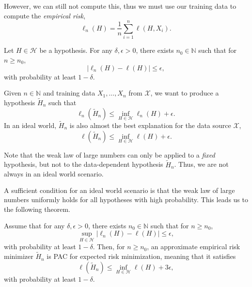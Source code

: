 However, we can still not compute this, thus we must use our training data to compute the
\textit{empirical risk}, \[
    \ell_n(H) = \frac{1}{n} \sum_{i=1}^{n} \ell(H,X_i).
\]

\begin{lemma}
    Let $H \in \mathcal{H}$ be a hypothesis. For any $\delta,\epsilon > 0$, there exists
    $n_0\in \mathbb{N}$ such that for $n \geq n_0$, \[
        | \ell_n(H) - \ell(H) | \leq \epsilon,
    \]
    with probability at least $1-\delta$.
\end{lemma}

Given $n\in \mathbb{N}$ and training data $X_1,\ldots,X_n$ from $\mathcal{X}$, we want to produce
a hypothesis $\tilde{H}_n$ such that \[
    \ell_n(\tilde{H}_n) \leq \inf_{H \in \mathcal{H}} \ell_n(H) + \epsilon.
\]
In an ideal world, $\tilde{H}_n$ is also almost the best explanation for the data source $\mathcal{X}$, \[
    \ell(\tilde{H}_n) \leq \inf_{H \in \mathcal{H}} \ell(H) + \epsilon.
\]

\begin{remark}
    Note that the weak law of large numbers can only be applied to a \textit{fixed} hypothesis, but
    not to the data-dependent hypothesis $\tilde{H}_n$. Thus, we are not always in an ideal world scenario.
\end{remark}

A sufficient condition for an ideal world scenario is that the weak law of large numbers uniformly
holds for all hypotheses with high probability. This leads us to the following theorem.

\begin{theorem}
    \label{thm:weaker-llm}

    Assume that for any $\delta,\epsilon > 0$, there exists $n_0 \in \mathbb{N}$ such that for $n \geq n_0$, \[
        \sup_{H\in \mathcal{H}} |\ell_n(H) - \ell(H)| \leq \epsilon,
    \]
    with probability at least $1-\delta$. Then, for $n \geq n_0$, an approximate empirical risk minimizer
    $\tilde{H}_n$ is PAC for expected risk minimization, meaning that it satisfies \[
        \ell(\tilde{H}_n) \leq \inf_{H\in \mathcal{H}} \ell(H) + 3\epsilon,
    \]
    with probability at least $1-\delta$.
\end{theorem}

